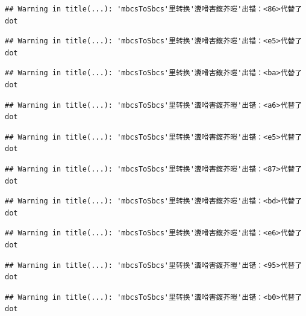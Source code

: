 \documentclass[
]{book}
\begin{document}
\begin{verbatim}
## Warning in title(...): 'mbcsToSbcs'里转换'瀵嗗害鍑芥暟'出错：<86>代替了dot
\end{verbatim}

\begin{verbatim}
## Warning in title(...): 'mbcsToSbcs'里转换'瀵嗗害鍑芥暟'出错：<e5>代替了dot
\end{verbatim}

\begin{verbatim}
## Warning in title(...): 'mbcsToSbcs'里转换'瀵嗗害鍑芥暟'出错：<ba>代替了dot
\end{verbatim}

\begin{verbatim}
## Warning in title(...): 'mbcsToSbcs'里转换'瀵嗗害鍑芥暟'出错：<a6>代替了dot
\end{verbatim}

\begin{verbatim}
## Warning in title(...): 'mbcsToSbcs'里转换'瀵嗗害鍑芥暟'出错：<e5>代替了dot
\end{verbatim}

\begin{verbatim}
## Warning in title(...): 'mbcsToSbcs'里转换'瀵嗗害鍑芥暟'出错：<87>代替了dot
\end{verbatim}

\begin{verbatim}
## Warning in title(...): 'mbcsToSbcs'里转换'瀵嗗害鍑芥暟'出错：<bd>代替了dot
\end{verbatim}

\begin{verbatim}
## Warning in title(...): 'mbcsToSbcs'里转换'瀵嗗害鍑芥暟'出错：<e6>代替了dot
\end{verbatim}

\begin{verbatim}
## Warning in title(...): 'mbcsToSbcs'里转换'瀵嗗害鍑芥暟'出错：<95>代替了dot
\end{verbatim}

\begin{verbatim}
## Warning in title(...): 'mbcsToSbcs'里转换'瀵嗗害鍑芥暟'出错：<b0>代替了dot
\end{verbatim}
\end{document}
